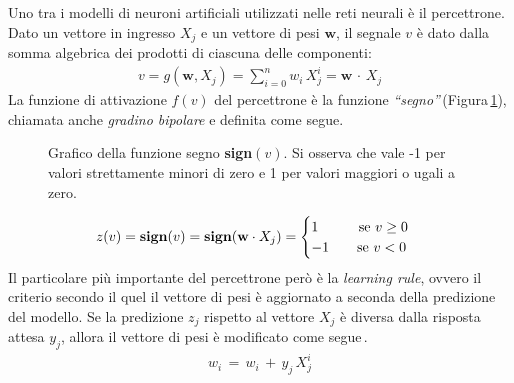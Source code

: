 Uno tra i modelli di neuroni artificiali utilizzati nelle reti neurali è il percettrone. Dato un vettore in ingresso $X_j$ e un vettore di pesi $\mathbf{w}$, il segnale $v$ è dato dalla somma algebrica dei prodotti di ciascuna delle componenti:
% 
\begin{gather*}
    v = g\left(\mathbf{w}, X_j\right) = \sum_{i = 0}^n w_i\,X_j^i = \mathbf{w} \, \cdot \,  X_j
\end{gather*}
% 
\noindent La funzione di attivazione $f(v)$ del percettrone è la funzione \textsl{``segno''}\,(Figura\,\ref{fig:sign-function}), chiamata anche \textsl{gradino bipolare} e definita come segue. 
% 
\begin{figure}[!t]
    \centering
    
    \caption[Grafico della funzione segno \textsl{sign}$(v)$.]{Grafico della funzione segno \textbf{sign}$(v)$. Si osserva che vale -1 per valori strettamente minori di zero e 1 per valori maggiori o ugali a zero.}\label{fig:sign-function}
\end{figure}
% 
\begin{gather*}
    z(v) = \text{\textbf{sign}}(v) = \text{\textbf{sign}}(\mathbf{w} \cdot X_j) =
    \begin{cases}
        1 \hspace{29px} \text{se } v\geq0\\
        -1 \hspace{20px} \text{se } v<0
    \end{cases}
\end{gather*}
% 
\noindent Il particolare più importante del percettrone però è la \textit{learning rule}, ovvero il criterio secondo il quel il vettore di pesi è aggiornato a seconda della predizione del modello. Se la predizione $z_j$ rispetto al vettore $X_j$ è diversa dalla risposta attesa $y_j$, allora il vettore di pesi è modificato come segue\,\cite{nielsen2015neural, flasinski2016introduction}.
% 
\begin{gather*}
    w_i \, = \, w_i \, + \, y_j\,X_j^i
\end{gather*}

